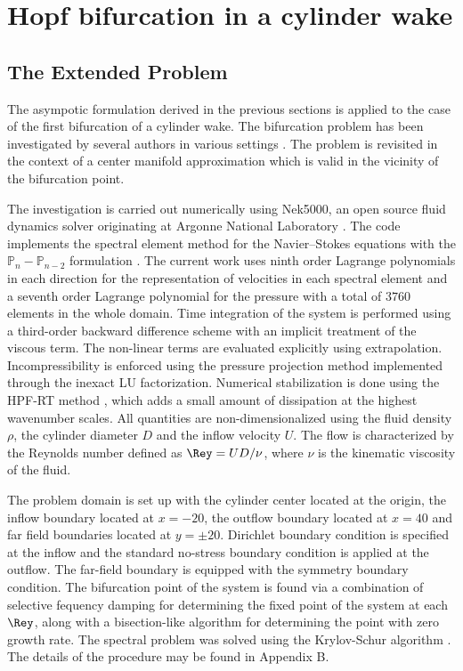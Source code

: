 \section{Hopf bifurcation in a cylinder wake}
\label{application_cylinder}

\subsection{The Extended Problem}

The asympotic formulation derived in the previous sections is applied to the case of the first bifurcation of a cylinder wake. The bifurcation problem has been investigated by several authors in various settings \citep{provansal87,dusek94,pier02,barkley06,giannetti07,sipp07,mantivc15,negi20}. The problem is revisited in the context of a center manifold approximation which is valid in the vicinity of the bifurcation point. 

The investigation is carried out numerically using Nek5000, an open source fluid dynamics solver originating at Argonne National Laboratory \citep{nek5000}. The code implements the spectral element method \citep{patera84}  for the Navier--Stokes equations with the $\mathds{P}_{n}-\mathds{P}_{n-2}$ formulation \citep{maday89}. The current work uses ninth order Lagrange polynomials in each direction for the representation of velocities in each spectral element and a seventh order Lagrange polynomial for the pressure with a total of $3760$ elements in the whole domain. Time integration of the system is performed using a third-order backward difference scheme with an implicit treatment of the viscous term. The non-linear terms are evaluated explicitly using extrapolation. Incompressibility is enforced using the pressure projection method \citep{deville02} implemented through the inexact LU factorization. Numerical stabilization is done using the HPF-RT method \citep{negiphd}, which adds a small amount of dissipation at the highest wavenumber scales. All quantities are non-dimensionalized using the fluid density $\rho$, the cylinder diameter $D$ and the inflow velocity $U$. The flow is characterized by the Reynolds number defined as $\Rey = UD/\nu$, where $\nu$ is the kinematic viscosity of the fluid. 

The problem domain is set up with the cylinder center located at the origin, the inflow boundary located at $x=-20$, the outflow boundary located at $x=40$ and far field boundaries located at $y=\pm20$. Dirichlet boundary condition is specified at the inflow and the standard no-stress boundary condition is applied at the outflow. The far-field boundary is equipped with the symmetry boundary condition. The bifurcation point of the system is found via a combination of selective fequency damping \citep{akervik06} for determining the fixed point of the system at each $\Rey$, along with a bisection-like algorithm for determining the point with zero growth rate. The spectral problem was solved using the Krylov-Schur algorithm \citep{stewart02}. The details of the procedure may be found in Appendix B.

